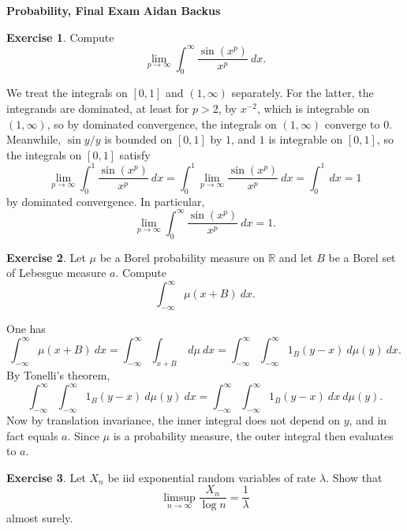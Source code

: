 \documentclass[10pt]{article}
\newcommand{\RR}{\mathbb{R}}
\theoremstyle{definition}
\newtheorem{exer}{Exercise}
\begin{document}
\noindent
\large\textbf{Probability, Final Exam} \hfill \textbf{Aidan Backus} \\


\begin{exer}
Compute
$$\lim_{p \to \infty} \int_0^\infty \frac{\sin(x^p)}{x^p}~dx.$$
\end{exer}

We treat the integrals on $[0, 1]$ and $(1, \infty)$ separately. For the latter, the integrands are dominated, at least for $p > 2$, by $x^{-2}$, which is integrable on $(1, \infty)$, so by dominated convergence, the integrals on $(1, \infty)$ converge to $0$.
Meanwhile, $\sin y/y$ is bounded on $[0, 1]$ by $1$, and $1$ is integrable on $[0, 1]$, so the integrals on $[0, 1]$ satisfy
$$\lim_{p \to \infty} \int_0^1 \frac{\sin(x^p)}{x^p} ~dx = \int_0^1 \lim_{p \to \infty} \frac{\sin(x^p)}{x^p}~dx = \int_0^1 ~dx = 1$$
by dominated convergence.
In particular,
$$\lim_{p \to \infty} \int_0^\infty \frac{\sin(x^p)}{x^p}~dx = 1.$$

\begin{exer}
Let $\mu$ be a Borel probability measure on $\RR$ and let $B$ be a Borel set of Lebesgue measure $a$. Compute
$$\int_{-\infty}^\infty \mu(x + B)~dx.$$
\end{exer}

One has
$$\int_{-\infty}^\infty \mu(x+B)~dx = \int_{-\infty}^\infty \int_{x + B} ~d\mu~dx = \int_{-\infty}^\infty \int_{-\infty}^\infty 1_B(y - x) ~d\mu(y)~dx.$$
By Tonelli's theorem,
$$\int_{-\infty}^\infty \int_{-\infty}^\infty 1_B(y - x) ~d\mu(y)~dx = \int_{-\infty}^\infty \int_{-\infty}^\infty 1_B(y - x) ~dx ~d\mu(y).$$
Now by translation invariance, the inner integral does not depend on $y$, and in fact equals $a$. Since $\mu$ is a probability measure, the outer integral then evaluates to $a$.

\begin{exer}
Let $X_n$ be iid exponential random variables of rate $\lambda$. Show that
$$\limsup_{n \to \infty} \frac{X_n}{\log n} = \frac{1}{\lambda}$$
almost surely.
\end{exer}
\end{document}
